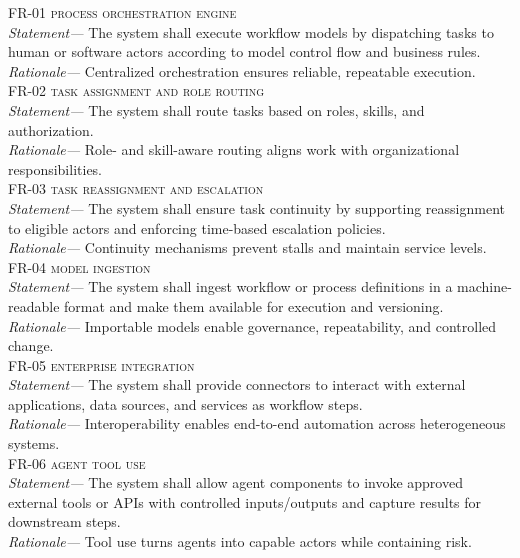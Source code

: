 \begin{footnotesize}
  \noindent \textsc{FR-01 process orchestration engine} \\
  \indent \emph{Statement—} The system shall execute workflow models by dispatching tasks to human or software actors according to model control flow and business rules. \\
  \indent \emph{Rationale—} Centralized orchestration ensures reliable, repeatable execution. \\

  \noindent \textsc{FR-02 task assignment and role routing} \\
  \indent \emph{Statement—} The system shall route tasks based on roles, skills, and authorization. \\
  \indent \emph{Rationale—} Role- and skill-aware routing aligns work with organizational responsibilities. \\

  \noindent \textsc{FR-03 task reassignment and escalation} \\
  \indent \emph{Statement—} The system shall ensure task continuity by supporting reassignment to eligible actors and enforcing time-based escalation policies. \\
  \indent \emph{Rationale—} Continuity mechanisms prevent stalls and maintain service levels. \\

  \noindent \textsc{FR-04 model ingestion} \\
  \indent \emph{Statement—} The system shall ingest workflow or process definitions in a machine-readable format and make them available for execution and versioning. \\
  \indent \emph{Rationale—} Importable models enable governance, repeatability, and controlled change. \\

  \noindent \textsc{FR-05 enterprise integration} \\
  \indent \emph{Statement—} The system shall provide connectors to interact with external applications, data sources, and services as workflow steps. \\
  \indent \emph{Rationale—} Interoperability enables end-to-end automation across heterogeneous systems. \\

  \noindent \textsc{FR-06 agent tool use} \\
  \indent \emph{Statement—} The system shall allow agent components to invoke approved external tools or APIs with controlled inputs/outputs and capture results for downstream steps. \\
  \indent \emph{Rationale—} Tool use turns agents into capable actors while containing risk. \\


\end{footnotesize}
